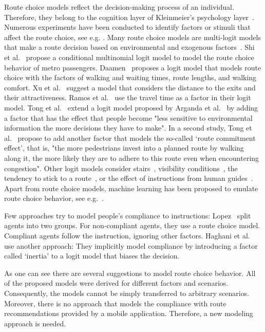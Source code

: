 Route choice models reflect the decision-making process of an individual. Therefore, they belong to the cognition layer of Kleinmeier's psychology layer~\cite{kleinmeier-2021-cdyn}.
Numerous experiments have been conducted to identify factors or stimuli that affect the route choice, see e.g. \cite{palma-2012-cdyn,crociani-2016b-cdyn,kinateder-2018-cdyn}. 
Many route choice models are multi-logit models that make a route decision based on environmental and exogenous factors~\cite{lopez-2021-cdyn}. 
Shi et al.~\cite{shi-2023-cdyn} propose a conditional multinomial logit model to model the route choice behavior of metro passengers. Daamen~\cite{daamen-2004-cdyn} proposes a logit model that models route choice with the factors of walking and waiting times, route lengths, and walking comfort.
Xu et al.~\cite{xu-2014-cdyn} suggest a model that considers the distance to the exits and their attractiveness. 
Ramos et al.~\cite{ramos-2020-cdyn} use the travel time as a factor in their logit model. 
Tong et al.~\cite{tong-2021-cdyn} extend a logit model proposed by Arganda et al.~\cite{arganda-2012-cdyn} by adding a factor that has the effect that people become "less sensitive to environmental information the more decisions they have to make". In a second study, Tong et al.~\cite{tong-2021b-cdyn} propose to add another factor that models the so-called ‘route commitment effect’, that is,  "the more pedestrians invest into a planned route by walking along it, the more likely they are to adhere to this route even when encountering congestion". 
Other logit models consider stairs~\cite{aleksandrov-2018-cdyn}, visibility conditions~\cite{lovreglio-2016-cdyn,haghani-2018b-cdyn}, the tendency to stick to a route~\cite{haghani-2019c-cdyn}, or the effect of instructions from human guides~\cite{nishida-2023-cdyn}. Apart from route choice models, machine learning has been  proposed to emulate route choice behavior, see e.g.~\cite{zhao-2023-cdyn}.


Few approaches try to model people's compliance to instructions:
Lopez~\cite{lopez-2021-cdyn} split agents into two groups. For non-compliant agents, they use a route choice model. Compliant agents follow the instruction, ignoring other factors.
Haghani et al.~\cite{haghani-2019c-cdyn} use another approach: They implicitly model compliance by introducing a factor called ‘inertia’ to a logit model that biases the decision.




As one can see there are several suggestions to model route choice behavior. All of the proposed models were derived for different factors and scenarios. 
Consequently, the models cannot be simply transferred to arbitrary scenarios. Moreover, there is no approach that models the compliance with route recommendations provided by a mobile application. Therefore, a new modeling approach is needed.





